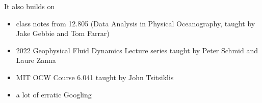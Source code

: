 \documentclass{article}
\begin{document}
It also builds on
\begin{itemize}
\item class notes from 12.805 (Data Analysis in Physical Oceanography, taught by Jake Gebbie and Tom Farrar)
\item 2022 Geophysical Fluid Dynamics Lecture series taught by Peter Schmid and Laure Zanna
\item MIT OCW Course 6.041 taught by John Tsitsiklis
\item a lot of erratic Googling 
\end{itemize}
\end{document}
